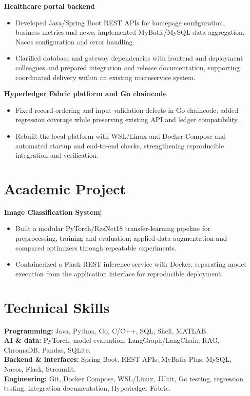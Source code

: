 \documentclass[11pt,a4paper]{article}
\newcommand{\project}[1]{\par\vspace{2pt}\textbf{#1}\par}
\begin{document}
\project{Healthcare portal backend}
\begin{itemize}
\item Developed Java/Spring Boot REST APIs for homepage configuration, business metrics and news; implemented MyBatis/MySQL data aggregation, Nacos configuration and error handling.
\item Clarified database and gateway dependencies with frontend and deployment colleagues and prepared integration and release documentation, supporting coordinated delivery within an existing microservice system.
\end{itemize}

\project{Hyperledger Fabric platform and Go chaincode}
\begin{itemize}
\item Fixed record-ordering and input-validation defects in Go chaincode; added regression coverage while preserving existing API and ledger compatibility.
\item Rebuilt the local platform with WSL/Linux and Docker Compose and automated startup and end-to-end checks, strengthening reproducible integration and verification.
\end{itemize}

\section*{Academic Project}
\textbf{Image Classification System}\enspace|
\begin{itemize}
\item Built a modular PyTorch/ResNet18 transfer-learning pipeline for preprocessing, training and evaluation; applied data augmentation and compared optimizers through repeatable experiments.
\item Containerized a Flask REST inference service with Docker, separating model execution from the application interface for reproducible deployment.
\end{itemize}

\section*{Technical Skills}
\textbf{Programming:} Java, Python, Go, C/C++, SQL, Shell, MATLAB.\\
\textbf{AI \& data:} PyTorch, model evaluation, LangGraph/LangChain, RAG, ChromaDB, Pandas, SQLite.\\
\textbf{Backend \& interfaces:} Spring Boot, REST APIs, MyBatis-Plus, MySQL, Nacos, Flask, Streamlit.\\
\textbf{Engineering:} Git, Docker Compose, WSL/Linux, JUnit, Go testing, regression testing, integration documentation, Hyperledger Fabric.
\end{document}
